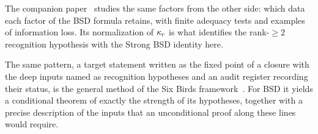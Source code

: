 The companion paper~\citep{TsiokosBSDApparatus2026} studies the same
factors from the other side: which data each factor of the BSD formula
retains, with finite adequacy tests and examples of information loss.
Its normalization of $\kappa_r$ is what identifies the rank-$\ge2$
recognition hypothesis with the Strong BSD identity here.

The same pattern, a target statement written as the fixed point of a
closure with the deep inputs named as recognition hypotheses and an
audit register recording their status, is the general method of the Six
Birds framework~\citep{TsiokosFoundationsIII2026,TsiokosAOR2026}.  For BSD
it yields a conditional theorem of exactly the strength of its
hypotheses, together with a precise description of the inputs that an
unconditional proof along these lines would require.
